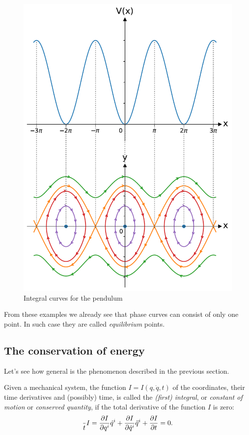 \documentclass[english,fontsize=11pt,paper=a5,oneside]{scrbook}
\let\d\relax
\newcommand{\d}{\mathrm{d}}
\theoremstyle{definition}
\begin{document}
\begin{figure}[htbp]
  \centering
  \includegraphics[width=.7\linewidth]{images/potential-curves-pendulum.pdf}
  \caption{Integral curves for the pendulum}
  \label{fig:pendulum}
\end{figure}

From these examples we already see that phase curves can consist of only one point. In such case they are called \emph{equilibrium} points.

\subsection{The conservation of energy}\label{sec:energy}

Let's see how general is the phenomenon described in the previous section.

\begin{tcolorbox}
  Given a mechanical system, the function $I = I(q, \dot q, t)$ of the coordinates, their time derivatives and (possibly) time, is called the \emph{(first) integral}, or \emph{constant of motion} or \emph{conserved quantity}, if the total derivative of the function $I$ is zero:
  \begin{equation}\label{eq:firstintegralD}
    \frac{\d}{\d t}I =
    \frac{\partial I}{\partial q^i} \dot q^i +
    \frac{\partial I}{\partial \dot q^i} \ddot q^i +
    \frac{\partial I}{\partial t}
    = 0.
  \end{equation}
\end{tcolorbox}
\end{document}
